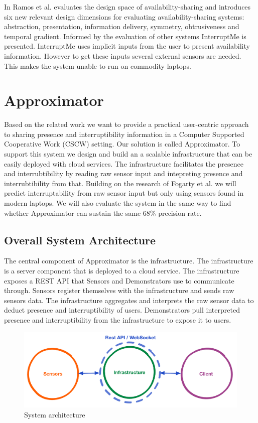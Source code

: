 \documentclass{sigchi}
\begin{document}
In \cite{hincapie2011design} Ramos et al. evaluates the design space of availability-sharing and introduces six new relevant design dimensions for evaluating availability-sharing systems: abstraction, presentation, information delivery, symmetry, obtrusiveness and temporal gradient.
Informed by the evaluation of other systems InterruptMe is presented.
InterruptMe uses implicit inputs from the user to present availability information.
However to get these inputs several external sensors are needed.
This makes the system unable to run on commodity laptops.

\section{Approximator}

Based on the related work we want to provide a practical user-centric approach to sharing presence and interruptibility information in a Computer Supported Cooperative Work (CSCW) setting.
Our solution is called Approximator.
To support this system we design and build an a scalable infrastructure that can be easily deployed with cloud services.
The infrastructure facilitates the presence and interrubtibility by reading raw sensor input and intepreting presence and interrubtibility from that.
Building on the research of Fogarty et al.\cite{fogarty2005predicting} we will predict interruptability from raw sensor input but only using sensors found in modern laptops. We will also evaluate the system in the same way to find whether Approximator can sustain the same 68\% precision rate.

\subsection{Overall System Architecture}

The central component of Approximator is the infrastructure.
The infrastructure is a server component that is deployed to a cloud service.
The infrastructure exposes a REST API that Sensors and Demonstrators use to communicate through.
Sensors register themselves with the infrastructure and sends raw sensors data.
The infrastructure aggregates and interprets the raw sensor data to deduct presence and interruptibility of users.
Demonstrators pull interpreted presence and interruptibility from the infrastructure to expose it to users.


\begin{figure}[H]
  \centering
  \includegraphics[width=\columnwidth]{figures/system_architecture.pdf}
  \caption{System architecture}
  \label{fig:architecture}
\end{figure}
\end{document}
